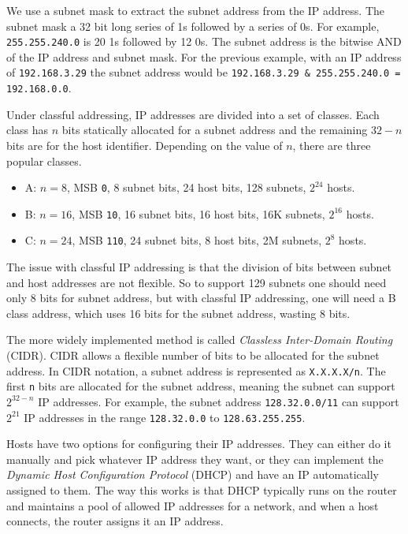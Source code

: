 We use a subnet mask to extract the
subnet address from the IP address.
The subnet mask a 32 bit long series
of 1s followed by a series of 0s.
For example, \texttt{255.255.240.0}
is 20 1s followed by 12 0s. The subnet
address is the bitwise AND of the
IP address and subnet mask. For the
previous example, with an IP address
of \texttt{192.168.3.29} the subnet
address would be
\texttt{192.168.3.29 \& 255.255.240.0 = 192.168.0.0}.

Under classful addressing, IP addresses
are divided into a set of classes.
Each class has $n$ bits statically
allocated for a subnet address and the
remaining $32-n$ bits are for the
host identifier. Depending on the
value of $n$, there are three
popular classes.
\begin{itemize}
    \item A: $n=8$, MSB \texttt{0}, 8 subnet bits, 24 host bits, 128 subnets, $2^24$ hosts.
    \item B: $n=16$, MSB \texttt{10}, 16 subnet bits, 16 host bits, 16K subnets, $2^16$ hosts.
    \item C: $n=24$, MSB \texttt{110}, 24 subnet bits, 8 host bits, 2M subnets, $2^8$ hosts.
\end{itemize}
The issue with classful IP addressing is that the division of bits between subnet
and host addresses are not flexible. So to support 129 subnets one should need
only 8 bits for subnet address, but with classful IP addressing, one will need a B
class address, which uses 16 bits for the subnet address, wasting 8 bits.

The more widely implemented method is called \emph{Classless Inter-Domain Routing}
(CIDR). CIDR allows a flexible number of bits to be allocated for the subnet
address. In CIDR notation, a subnet address is represented as \texttt{X.X.X.X/n}.
The first \texttt{n} bits are allocated for the subnet address, meaning the subnet can
support $2^{32-n}$ IP addresses. For example, the subnet address \texttt{128.32.0.0/11}
can support $2^21$ IP addresses in the range \texttt{128.32.0.0} to \texttt{128.63.255.255}.

Hosts have two options for configuring their IP addresses. They can either do it manually
and pick whatever IP address they want, or they can implement the \emph{Dynamic Host
    Configuration Protocol} (DHCP) and have an IP automatically assigned to them. The way
this works is that DHCP typically runs on the router and maintains a pool of allowed
IP addresses for a network, and when a host connects, the router assigns it an IP
address.

